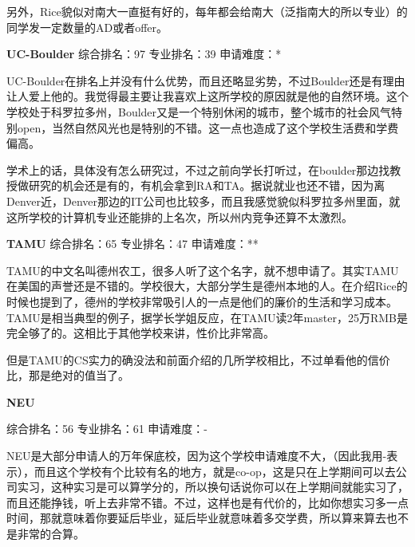 另外，Rice貌似对南大一直挺有好的，每年都会给南大（泛指南大的所以专业）的同学发一定数量的AD或者offer。\par

\textbf{UC-Boulder}
综合排名：97 专业排名：39 申请难度：* \par

UC-Boulder在排名上并没有什么优势，而且还略显劣势，不过Boulder还是有理由让人爱上他的。我觉得最主要让我喜欢上这所学校的原因就是他的自然环境。这个学校处于科罗拉多州，Boulder又是一个特别休闲的城市，整个城市的社会风气特别open，当然自然风光也是特别的不错。这一点也造成了这个学校生活费和学费偏高。\par

学术上的话，具体没有怎么研究过，不过之前向学长打听过，在boulder那边找教授做研究的机会还是有的，有机会拿到RA和TA。据说就业也还不错，因为离Denver近，Denver那边的IT公司也比较多，而且我感觉貌似科罗拉多州里面，就这所学校的计算机专业还能排的上名次，所以州内竞争还算不太激烈。\par

\textbf{TAMU}
综合排名：65 专业排名：47 申请难度：** \par

TAMU的中文名叫德州农工，很多人听了这个名字，就不想申请了。其实TAMU在美国的声誉还是不错的。学校很大，大部分学生是德州本地的人。在介绍Rice的时候也提到了，德州的学校非常吸引人的一点是他们的廉价的生活和学习成本。TAMU是相当典型的例子，据学长学姐反应，在TAMU读2年master，25万RMB是完全够了的。这相比于其他学校来讲，性价比非常高。\par

但是TAMU的CS实力的确没法和前面介绍的几所学校相比，不过单看他的信价比，那是绝对的值当了。\par

\textbf{NEU} \par
综合排名：56 专业排名：61 申请难度：- \par
NEU是大部分申请人的万年保底校，因为这个学校申请难度不大，（因此我用-表示），而且这个学校有个比较有名的地方，就是co-op，这是只在上学期间可以去公司实习，这种实习是可以算学分的，所以换句话说你可以在上学期间就能实习了，而且还能挣钱，听上去非常不错。不过，这样也是有代价的，比如你想实习多一点时间，那就意味着你要延后毕业，延后毕业就意味着多交学费，所以算来算去也不是非常的合算。\par
\clearpage
